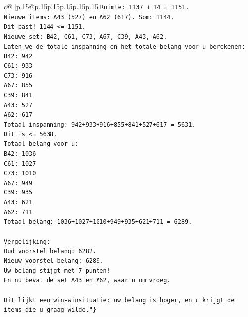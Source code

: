 \documentclass{article}
\begin{document}
{\begin{supertabular}{c@{$\;$}|p{.15\linewidth}@{}p{.15\linewidth}p{.15\linewidth}p{.15\linewidth}p{.15\linewidth}p{.15\linewidth}}
{{{\texttt{Ruimte: 1137 + 14 = 1151.} \\
\texttt{Nieuwe items: A43 (527) en A62 (617). Som: 1144.} \\
\texttt{Dit past! 1144 <= 1151.} \\
\texttt{Nieuwe set: B42, C61, C73, A67, C39, A43, A62.} \\
\texttt{Laten we de totale inspanning en het totale belang voor u berekenen:} \\
\texttt{B42: 942} \\
\texttt{C61: 933} \\
\texttt{C73: 916} \\
\texttt{A67: 855} \\
\texttt{C39: 841} \\
\texttt{A43: 527} \\
\texttt{A62: 617} \\
\texttt{Totaal inspanning: 942+933+916+855+841+527+617 = 5631.} \\
\texttt{Dit is <= 5638.} \\
\texttt{Totaal belang voor u:} \\
\texttt{B42: 1036} \\
\texttt{C61: 1027} \\
\texttt{C73: 1010} \\
\texttt{A67: 949} \\
\texttt{C39: 935} \\
\texttt{A43: 621} \\
\texttt{A62: 711} \\
\texttt{Totaal belang: 1036+1027+1010+949+935+621+711 = 6289.} \\
\\ 
\texttt{Vergelijking:} \\
\texttt{Oud voorstel belang: 6282.} \\
\texttt{Nieuw voorstel belang: 6289.} \\
\texttt{Uw belang stijgt met 7 punten!} \\
\texttt{En nu bevat de set A43 en A62, waar u om vroeg.} \\
\\ 
\texttt{Dit lijkt een win{-}winsituatie: uw belang is hoger, en u krijgt de items die u graag wilde."\}} \\
            }
        }
    }
     \\ \\


\end{supertabular}}
\end{document}
